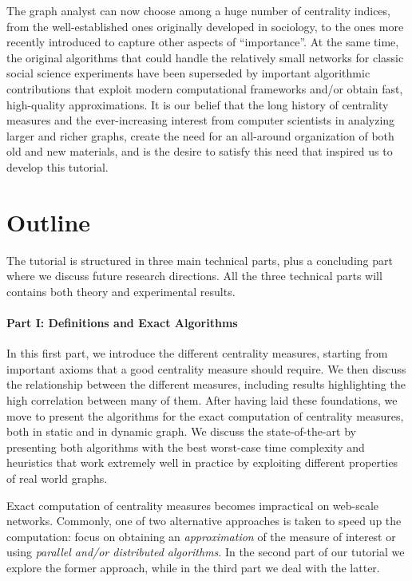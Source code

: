 \documentclass[pdfpagelabels=false]{sig-alternate-2013} %
\begin{document}
The graph analyst can now choose among a huge number of centrality indices, from
the well-established ones originally developed in sociology, to the ones more
recently introduced to capture other aspects of ``importance''.  At the same
time, the original algorithms that could handle the relatively small networks
for classic social science experiments have been superseded by important
algorithmic contributions that exploit modern computational frameworks and/or
obtain fast, high-quality approximations. It is our belief that the long history of
centrality measures and the ever-increasing interest from computer
scientists in analyzing larger and richer graphs, create the need for an
all-around organization of both old and new materials, and is the desire to
satisfy this need that inspired us to develop this tutorial.

\section{Outline}
The tutorial is structured in three main technical parts, plus a concluding part
where we discuss future research directions. All the three technical parts will
contains both theory and experimental results.

\paragraph{Part I: Definitions and Exact Algorithms}
In this first part, we introduce the different centrality measures, starting
from important axioms that a good centrality measure should require. We then
discuss the relationship between the different measures, including
results highlighting the high correlation between many of them. After having
laid these foundations, we move to present the algorithms for the exact
computation of centrality measures, both in static and in dynamic graph. We
discuss the state-of-the-art by presenting both algorithms with the best
worst-case time complexity and heuristics that work extremely well in practice
by exploiting different properties of real world graphs.

Exact computation of centrality measures becomes impractical on web-scale
networks. Commonly, one of two alternative approaches is taken to speed up the
computation: focus on obtaining an \emph{approximation} of the measure of
interest or using \emph{parallel and/or distributed algorithms}. In the second
part of our tutorial we explore the former approach, while in the third part we
deal with the latter.
\end{document}
